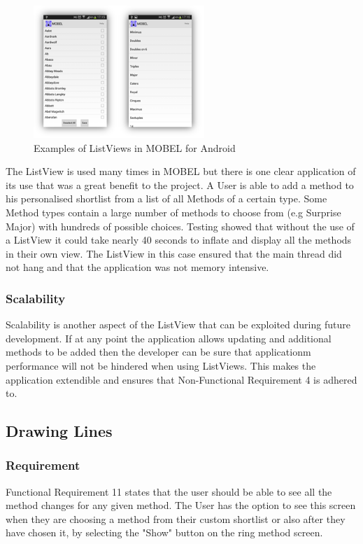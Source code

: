 \documentclass{l4proj}
\begin{document}
\begin{figure}
\centering
\includegraphics[height=5cm]{ListViews.png}
\vspace{0mm}
\caption{Examples of ListViews in MOBEL for Android}
\label{listviewAndroid}
\end{figure}

The ListView is used many times in MOBEL but there is one clear application of its use that was a great benefit to the project.  A User is able to add a method to his personalised shortlist from a list of all Methods of a certain type.  Some Method types contain a large number of methods to choose from (e.g Surprise Major) with hundreds of possible choices.  Testing showed that without the use of a ListView it could take nearly 40 seconds to inflate and display all the methods in their own view.  The ListView in this case ensured that the main thread did not hang and that the application was not memory intensive.
\subsubsection{Scalability}
Scalability is another aspect of the ListView that can be exploited during future development. If at any point the application allows updating and additional methods to be added then the developer can be sure that applicationm performance will not be hindered when using ListViews.  This makes the application extendible and ensures that Non-Functional Requirement 4 is adhered to.



\subsection{Drawing Lines}
\subsubsection{Requirement}
Functional Requirement 11 states that the user should be able to see all the method changes for any given method. The User has the option to see this screen when they are choosing a method from their custom shortlist or also after they have chosen it, by selecting the "Show" button on the ring method screen.
\end{document}
